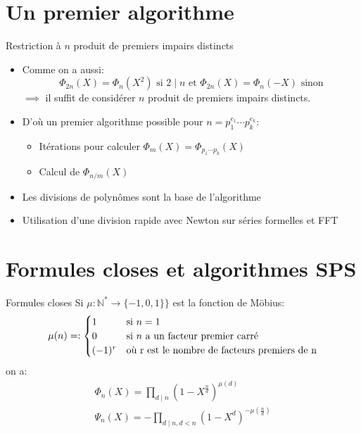 \documentclass{beamer}
\begin{document}
	\section{Un premier algorithme}

	\begin{frame}{Restriction à $n$ produit de premiers impairs distincts}
		\begin{itemize}
			\item Comme on a aussi: $$\Phi_{2n}(X) = \Phi_n(X^2) \text{ si } 2 \mid n \text{ et }\Phi_{2n}(X) = \Phi_n(-X) \text{ sinon}$$ $\implies$ il suffit de considérer $n$ produit de premiers impairs distincts.
			\item D'où un premier algorithme possible pour $n = p_1^{e_1} \cdots p_k^{e_k}$:
			\begin{itemize}
				\item Itérations pour calculer $\Phi_m(X) = \Phi_{p_1 \cdots p_k}(X)$
				\item Calcul de $\Phi_{n/m}(X)$
			\end{itemize}
			\item Les divisions de polynômes sont la base de l'algorithme
			\item Utilisation d'une division rapide avec Newton sur séries formelles et FFT
		\end{itemize}
	\end{frame}

	\section{Formules closes et algorithmes SPS}

	\begin{frame}{Formules closes}
		Si $\mu : \mathbb N^* \to \{-1, 0, 1\}\}$ est la fonction de Möbius:
		\begin{displaymath}
			\mu(n) = :
			\begin{cases}
				1 & \text{si } n = 1\\
				0 & \text{si } n \text{ a un facteur premier carré}\\
				(-1)^r & \text{où } $r$ \text{ est le nombre de facteurs premiers de } $n$\\
			\end{cases}
		\end{displaymath}
		on a:
		\begin{align}		
			\Phi_n(X) = \prod_{d \mid n} (1 - X^\frac{n}{d})^{\mu(d)} \tag{2.4}\label{mobphi}\\
			\Psi_n(X) = -\prod_{d \mid n, d<n} (1 - X^d)^{-\mu(\frac{n}{d})}\tag{2.5}\label{mobpsi}
		\end{align}
	\end{frame}
\end{document}
